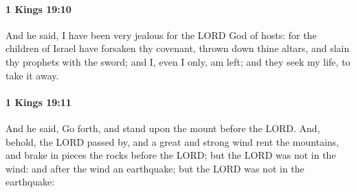 		\paragraph{1 Kings 19:10} %
			\label{1KINGS-19-10}

			And he said, I have been very jealous for the LORD God of hosts: for the children of Israel have forsaken thy covenant, thrown down thine altars, and slain thy prophets with the sword; and I, even I only, am left; and they seek my life, to take it away.


		\paragraph{1 Kings 19:11} %
			\label{1KINGS-19-11}

			And he said, Go forth, and stand upon the mount before the LORD. And, behold, the LORD passed by, and a great and strong wind rent the mountains, and brake in pieces the rocks before the LORD; but the LORD was not in the wind: and after the wind an earthquake; but the LORD was not in the earthquake:

